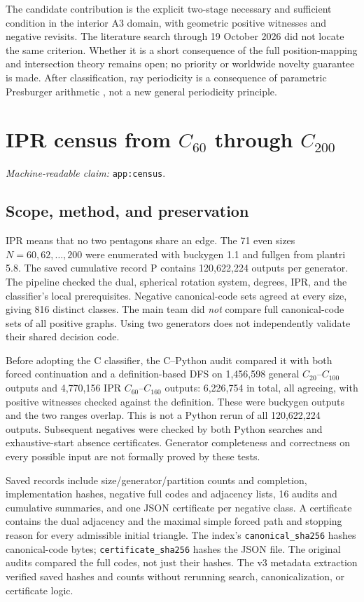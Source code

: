 \documentclass[11pt]{amsart}
\newcommand{\record}[1]{\nolinkurl{#1}}
\newcommand{\claimid}[1]{\par\nopagebreak\noindent\textit{Machine-readable claim:} \record{#1}.\par}
\begin{document}
The candidate contribution is the explicit two-stage necessary and
sufficient condition in the interior A3 domain, with geometric positive
witnesses and negative revisits. The literature search through
19 October 2026 did not locate the same criterion. Whether it is a
short consequence of the full position-mapping and intersection theory
remains open; no priority or worldwide novelty guarantee is made.
After classification, ray periodicity is a consequence of parametric
Presburger arithmetic \cite[Theorem 1.15, Property 1]{BGW}, not a new
general periodicity principle.

\appendix
\section{IPR census from \texorpdfstring{$C_{60}$}{C60} through \texorpdfstring{$C_{200}$}{C200}}\label{app:census}
\claimid{app:census}
\subsection{Scope, method, and preservation}
IPR means that no two pentagons share an edge. The 71 even sizes
$N=60,62,\ldots,200$ were enumerated with buckygen 1.1 and fullgen
from plantri 5.8. The saved cumulative record P contains 120,622,224
outputs per generator. The pipeline checked the dual, spherical
rotation system, degrees, IPR, and the classifier's local prerequisites.
Negative canonical-code sets agreed at every size, giving 816 distinct
classes. The main team did \emph{not} compare full canonical-code sets
of all positive graphs. Using two generators does not independently
validate their shared decision code.

Before adopting the C classifier, the C--Python audit compared it with
both forced continuation and a definition-based DFS on 1,456,598
general $C_{20}$--$C_{100}$ outputs and 4,770,156 IPR
$C_{60}$--$C_{160}$ outputs: 6,226,754 in total, all agreeing, with
positive witnesses checked against the definition. These were buckygen
outputs and the two ranges overlap. This is not a Python rerun of all
120,622,224 outputs. Subsequent negatives were checked by both Python
searches and exhaustive-start absence certificates. Generator
completeness and correctness on every possible input are not formally
proved by these tests.

Saved records include size/generator/partition counts and completion,
implementation hashes, negative full codes and adjacency lists, 16
audits and cumulative summaries, and one JSON certificate per negative
class. A certificate contains the dual adjacency and the maximal
simple forced path and stopping reason for every admissible initial
triangle. The index's \record{canonical_sha256} hashes canonical-code
bytes; \record{certificate_sha256} hashes the JSON file. The original
audits compared the full codes, not just their hashes. The v3 metadata
extraction verified saved hashes and counts without rerunning search,
canonicalization, or certificate logic.
\end{document}
